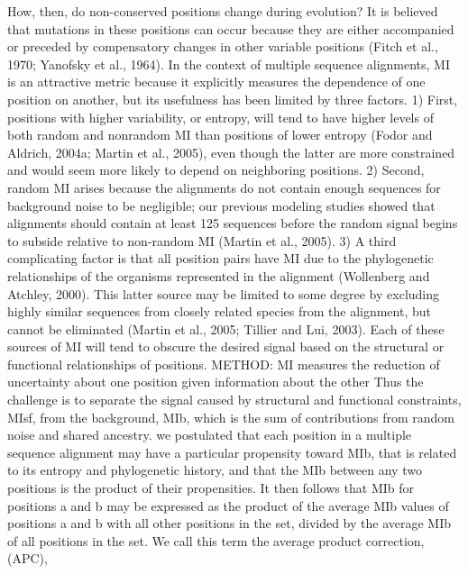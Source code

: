 How, then, do non-conserved positions change during evolution? It is believed that mutations in these positions can occur because they are either accompanied or preceded by compensatory changes in other variable positions (Fitch et al., 1970; Yanofsky et al., 1964). \cite{dunn2008mutual}
In the context of multiple sequence alignments, MI is an attractive metric because it explicitly measures the dependence of one position on another, but its usefulness has been limited by three factors.  \cite{dunn2008mutual}
	1) First, positions with higher variability, or entropy, will tend to have higher levels of both random and nonrandom MI than positions of lower entropy (Fodor and Aldrich, 2004a; Martin et al., 2005), even though the latter are more constrained and would seem more likely to depend on neighboring positions.  \cite{dunn2008mutual}
	2) Second, random MI arises because the alignments do not contain enough sequences for background noise to be negligible; our previous modeling studies showed that alignments should contain at least 125 sequences before the random signal begins to subside relative to non-random MI (Martin et al., 2005).  \cite{dunn2008mutual}
	3) A third complicating factor is that all position pairs have MI due to the phylogenetic relationships of the organisms represented in the alignment (Wollenberg and Atchley, 2000). This latter source may be limited to some degree by excluding highly similar sequences from closely related species from the alignment, but cannot be eliminated (Martin et al., 2005; Tillier and Lui, 2003). Each of these sources of MI will tend to obscure the desired signal based on the structural or functional relationships of positions. \cite{dunn2008mutual}
METHOD:  \cite{dunn2008mutual}
	MI measures the reduction of uncertainty about one position given information about the other  \cite{dunn2008mutual}
	Thus the challenge is to separate the signal caused by structural and functional constraints, MIsf, from the background, MIb, which is the sum of contributions from random noise and shared ancestry. \cite{dunn2008mutual}
	we postulated that each position in a multiple sequence alignment may have a particular propensity toward MIb, that is related to its entropy and phylogenetic history, and that the MIb between any two positions is the product of their propensities. It then follows that MIb for positions a and b may be expressed as the product of the average MIb values of positions a and b with all other positions in the set, divided by the average MIb of all positions in the set. We call this term the average product correction, (APC), \cite{dunn2008mutual}
